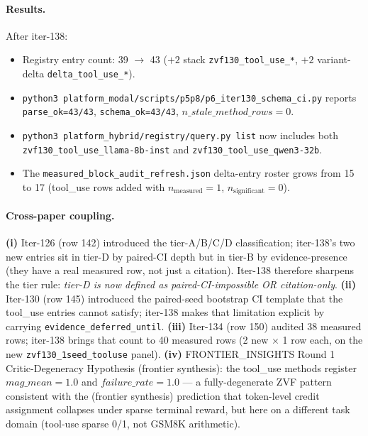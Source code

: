 \paragraph{Results.}
After iter-138:
\begin{itemize}
\item Registry entry count: 39 $\to$ 43
  ($+2$ stack \texttt{zvf130\_tool\_use\_*},
  $+2$ variant-delta \texttt{delta\_tool\_use\_*}).
\item \texttt{python3 platform_modal/scripts/p5p8/p6\_iter130\_schema\_ci.py} reports
  \texttt{parse\_ok=43/43}, \texttt{schema\_ok=43/43},
  $\mathit{n\_stale\_method\_rows}=0$.
\item \texttt{python3 platform_hybrid/registry/query.py list} now includes both
  \texttt{zvf130\_tool\_use\_llama-8b-inst} and
  \texttt{zvf130\_tool\_use\_qwen3-32b}.
\item The \texttt{measured\_block\_audit\_refresh.json} delta-entry
  roster grows from 15 to 17 (tool\_use rows added with
  $n_{\text{measured}}=1$, $n_{\text{significant}}=0$).
\end{itemize}

\paragraph{Cross-paper coupling.}
\textbf{(i)} Iter-126 (row 142) introduced the tier-A/B/C/D
classification; iter-138's two new entries sit in tier-D by paired-CI
depth but in tier-B by evidence-presence (they have a real measured
row, not just a citation). Iter-138 therefore sharpens the tier rule:
\emph{tier-D is now defined as paired-CI-impossible OR
citation-only}. \textbf{(ii)} Iter-130 (row 145) introduced the
paired-seed bootstrap CI template that the tool\_use entries cannot
satisfy; iter-138 makes that limitation explicit by carrying
\texttt{evidence\_deferred\_until}. \textbf{(iii)} Iter-134 (row 150)
audited 38 measured rows; iter-138 brings that count to 40 measured
rows (2 new $\times$ 1 row each, on the new \texttt{zvf130\_1seed\_tooluse}
panel). \textbf{(iv)} FRONTIER\_INSIGHTS Round 1 Critic-Degeneracy
Hypothesis (frontier synthesis): the tool\_use methods register
$\mathit{mag\_mean}=1.0$ and $\mathit{failure\_rate}=1.0$ --- a
fully-degenerate ZVF pattern consistent with the (frontier synthesis)
prediction that token-level credit assignment collapses under sparse
terminal reward, but here on a different task domain (tool-use
sparse 0/1, not GSM8K arithmetic).